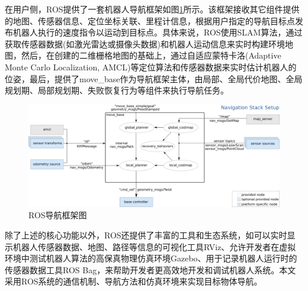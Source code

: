在用户侧，ROS提供了一套机器人导航框架如图\ref{fROSNavstack}所示。该框架接收其它组件提供的地图、传感器信息、定位坐标关联、里程计信息，根据用户指定的导航目标点发布机器人执行的速度指令以运动到目标点。具体来说，ROS使用SLAM算法，通过获取传感器数据(如激光雷达或摄像头数据)和机器人运动信息来实时构建环境地图，然后，在创建的二维栅格地图的基础上，通过自适应蒙特卡洛(Adaptive Monte Carlo Localization, AMCL)等定位算法和传感器数据来实时估计机器人的位姿，最后，提供了move\_base作为导航框架主体，由局部、全局代价地图、全局规划期、局部规划期、失败恢复行为等组件来执行导航任务。

\begin{figure}[htbp]
    \centering
    \includegraphics[scale=0.50]{Fig/ROSNavstack.png}
    \caption{\label{fROSNavstack}ROS导航框架图}
\end{figure}


除了上述的核心功能以外，ROS还提供了丰富的工具和生态系统，如可以实时显示机器人传感器数据、地图、路径等信息的可视化工具RViz、允许开发者在虚拟环境中测试机器人算法的高保真物理仿真环境Gazebo、用于记录机器人运行时的传感器数据工具ROS Bag，来帮助开发者更高效地开发和调试机器人系统。本文采用ROS系统的通信机制、导航方法和仿真环境来实现目标物体导航。


